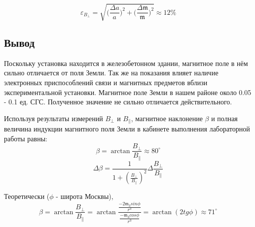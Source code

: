\documentclass[a4paper,12pt]{article}
\begin{document}
\[\varepsilon_{B_{\perp}} = \sqrt{\Big(\frac{\Delta a}a\Big)^2 + \Big(\frac{\Delta \mathfrak{m}}{\mathfrak{m}}\Big)^2} \approx 12 \%\]


\subsection{Вывод}
Поскольку  установка находится в железобетонном
здании, магнитное поле в нём сильно отличается от поля Земли. Так же на
показания влияет наличие электронных приспособлений связи и магнитных предметов вблизи экспериментальной установки. Магнитное
поле Земли в нашем районе около 0.05 - 0.1 ед. СГС. Полученное значение не сильно отличается действительного.

Используя результаты измерений $B_{\perp}$ и $B_{\|}$, магнитное наклонение $\beta$ и полная величина индукции магнитного поля Земли в кабинете выполнения лабораторной работы равны:
$$\beta = \arctan{\frac{B_{\perp}}{B_{\|}}} \approx 80^{\circ}  $$
$$\Delta \beta = \frac{1}{1 + (\frac{B_{\perp}}{B_{\|}})^2} \Delta \frac{B_{\perp}}{B_{\|}}$$

Теоретически ($\phi$ - широта Москвы),
\[\beta = \arctan\frac{B_{\perp}}{B_{\|}} = \arctan\frac{\frac{-2\mathfrak{m}_3sin\phi}{r^3}}{\frac{-\mathfrak{m}_3cos\phi}{r^3}} = \arctan(2 tg\phi) \approx 71^{\circ}\]
\end{document}
